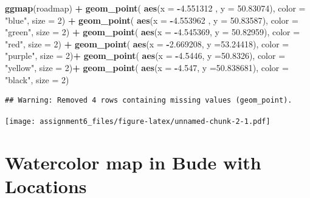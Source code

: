 \documentclass[]{article}
\newenvironment{Shaded}{\begin{snugshade}}{\end{snugshade}}
\newcommand{\KeywordTok}[1]{\textcolor[rgb]{0.13,0.29,0.53}{\textbf{#1}}}
\newcommand{\DataTypeTok}[1]{\textcolor[rgb]{0.13,0.29,0.53}{#1}}
\newcommand{\DecValTok}[1]{\textcolor[rgb]{0.00,0.00,0.81}{#1}}
\newcommand{\FloatTok}[1]{\textcolor[rgb]{0.00,0.00,0.81}{#1}}
\newcommand{\StringTok}[1]{\textcolor[rgb]{0.31,0.60,0.02}{#1}}
\newcommand{\OperatorTok}[1]{\textcolor[rgb]{0.81,0.36,0.00}{\textbf{#1}}}
\newcommand{\NormalTok}[1]{#1}
\begin{document}
\begin{Shaded}
\begin{Highlighting}[]
\KeywordTok{ggmap}\NormalTok{(roadmap) }\OperatorTok{+}
\StringTok{  }\KeywordTok{geom_point}\NormalTok{(}
    \KeywordTok{aes}\NormalTok{(}\DataTypeTok{x =} \OperatorTok{-}\FloatTok{4.551312}\NormalTok{ , }\DataTypeTok{y =} \FloatTok{50.83074}\NormalTok{),}
    \DataTypeTok{color =} \StringTok{"blue"}\NormalTok{, }\DataTypeTok{size =} \DecValTok{2}\NormalTok{) }\OperatorTok{+}
\StringTok{  }\KeywordTok{geom_point}\NormalTok{(}
    \KeywordTok{aes}\NormalTok{(}\DataTypeTok{x =} \OperatorTok{-}\FloatTok{4.553962}\NormalTok{ , }\DataTypeTok{y =} \FloatTok{50.83587}\NormalTok{),}
    \DataTypeTok{color =} \StringTok{"green"}\NormalTok{, }\DataTypeTok{size =} \DecValTok{2}\NormalTok{) }\OperatorTok{+}
\StringTok{  }\KeywordTok{geom_point}\NormalTok{(}
    \KeywordTok{aes}\NormalTok{(}\DataTypeTok{x =} \OperatorTok{-}\FloatTok{4.545369}\NormalTok{, }\DataTypeTok{y =} \FloatTok{50.82959}\NormalTok{),}
    \DataTypeTok{color =} \StringTok{"red"}\NormalTok{, }\DataTypeTok{size =} \DecValTok{2}\NormalTok{) }\OperatorTok{+}
\StringTok{  }\KeywordTok{geom_point}\NormalTok{(}
    \KeywordTok{aes}\NormalTok{(}\DataTypeTok{x =} \OperatorTok{-}\FloatTok{2.669208}\NormalTok{, }\DataTypeTok{y =}\FloatTok{53.24418}\NormalTok{),}
    \DataTypeTok{color =} \StringTok{"purple"}\NormalTok{, }\DataTypeTok{size =} \DecValTok{2}\NormalTok{)}\OperatorTok{+}
\StringTok{  }\KeywordTok{geom_point}\NormalTok{(}
    \KeywordTok{aes}\NormalTok{(}\DataTypeTok{x =} \OperatorTok{-}\FloatTok{4.5446}\NormalTok{, }\DataTypeTok{y =}\FloatTok{50.8326}\NormalTok{),}
    \DataTypeTok{color =} \StringTok{"yellow"}\NormalTok{, }\DataTypeTok{size =} \DecValTok{2}\NormalTok{)}\OperatorTok{+}
\StringTok{  }\KeywordTok{geom_point}\NormalTok{(}
    \KeywordTok{aes}\NormalTok{(}\DataTypeTok{x =} \OperatorTok{-}\FloatTok{4.547}\NormalTok{, }\DataTypeTok{y =}\FloatTok{50.838681}\NormalTok{),}
    \DataTypeTok{color =} \StringTok{"black"}\NormalTok{, }\DataTypeTok{size =} \DecValTok{2}\NormalTok{)}
\end{Highlighting}
\end{Shaded}

\begin{verbatim}
## Warning: Removed 4 rows containing missing values (geom_point).
\end{verbatim}

\texttt{[image: assignment6\_files/figure-latex/unnamed-chunk-2-1.pdf]}

\section{Watercolor map in Bude with
Locations}\label{watercolor-map-in-bude-with-locations}
\end{document}
